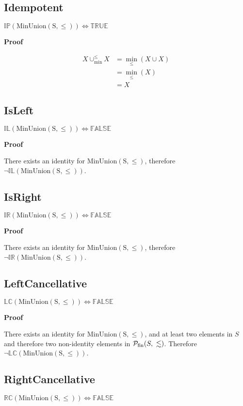 \documentclass[10pt]{article}
\newcommand{\propname}[1]{{\mathbb{#1}}}
\newcommand{\minunion}{\cup_{\min}^{\leq}}
\newcommand{\proof}{\vspace{1em} \textbf{Proof} \vspace{1em}}
\begin{document}
\subsection{Idempotent}
$\propname{IP}(\mathrm{MinUnion(S,\leq)}) \Leftrightarrow \propname{TRUE}$

\proof

\begin{align*}
X \minunion X 	& = \min_\leq(X \cup X) \\
				& = \min_\leq(X) \\
				& = X
\end{align*}



\subsection{IsLeft}
$\propname{IL}(\mathrm{MinUnion(S,\leq)}) \Leftrightarrow \propname{FALSE}$

\proof

There exists an identity for $\mathrm{MinUnion(S,\leq)}$, therefore $\neg \propname{IL}(\mathrm{MinUnion(S,\leq)})$.



\subsection{IsRight}
$\propname{IR}(\mathrm{MinUnion(S,\leq)}) \Leftrightarrow \propname{FALSE}$

\proof

There exists an identity for $\mathrm{MinUnion(S,\leq)}$, therefore $\neg \propname{IR}(\mathrm{MinUnion(S,\leq)})$.



\subsection{LeftCancellative}
$\propname{LC}(\mathrm{MinUnion(S,\leq)}) \Leftrightarrow \propname{FALSE}$

\proof

There exists an identity for $\mathrm{MinUnion(S,\leq)}$, and at least two elements in $S$ and therefore two non-identity elements in ${\cal P}_{\mathrm{fin}}(S,\ \lesssim)$. Therefore $\neg \propname{LC}(\mathrm{MinUnion(S,\leq)})$.

\subsection{RightCancellative}
$\propname{RC}(\mathrm{MinUnion(S,\leq)}) \Leftrightarrow \propname{FALSE}$
\end{document}
